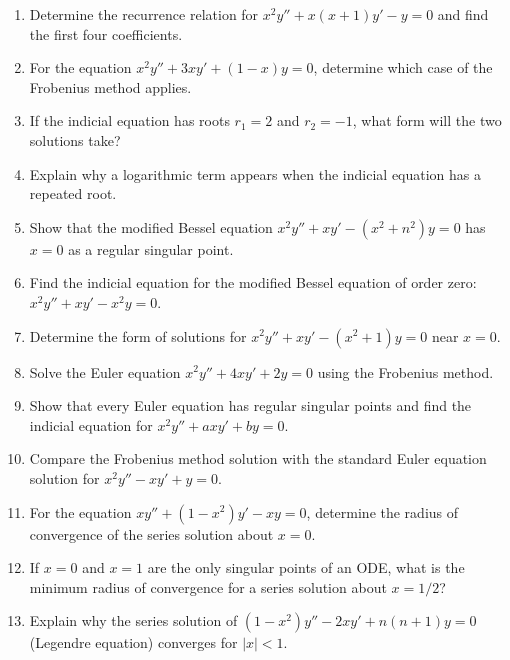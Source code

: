 \documentclass[12pt]{article}
\begin{document}
\begin{enumerate}[label=\textbf{\arabic*.}]
\item Determine the recurrence relation for $x^2y'' + x(x+1)y' - y = 0$ and find the first four coefficients.

\item For the equation $x^2y'' + 3xy' + (1-x)y = 0$, determine which case of the Frobenius method applies.

\item If the indicial equation has roots $r_1 = 2$ and $r_2 = -1$, what form will the two solutions take?

\item Explain why a logarithmic term appears when the indicial equation has a repeated root.

\item Show that the modified Bessel equation $x^2y'' + xy' - (x^2 + n^2)y = 0$ has $x = 0$ as a regular singular point.

\item Find the indicial equation for the modified Bessel equation of order zero: $x^2y'' + xy' - x^2y = 0$.

\item Determine the form of solutions for $x^2y'' + xy' - (x^2 + 1)y = 0$ near $x = 0$.

\item Solve the Euler equation $x^2y'' + 4xy' + 2y = 0$ using the Frobenius method.

\item Show that every Euler equation has regular singular points and find the indicial equation for $x^2y'' + axy' + by = 0$.

\item Compare the Frobenius method solution with the standard Euler equation solution for $x^2y'' - xy' + y = 0$.

\item For the equation $xy'' + (1-x^2)y' - xy = 0$, determine the radius of convergence of the series solution about $x = 0$.

\item If $x = 0$ and $x = 1$ are the only singular points of an ODE, what is the minimum radius of convergence for a series solution about $x = 1/2$?

\item Explain why the series solution of $(1-x^2)y'' - 2xy' + n(n+1)y = 0$ (Legendre equation) converges for $|x| < 1$.


\end{enumerate}
\end{document}
